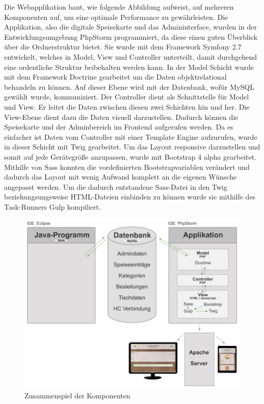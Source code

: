 Die Webapplikation baut, wie folgende Abbildung aufweist, auf mehreren Komponenten auf, um eine optimale Performance zu gewährleisten.
Die Applikation, also die digitale Speisekarte und das Admininterface, wurden in der Entwicklungsumgebung PhpStorm programmiert, da diese einen guten Überblick über die Ordnerstruktur bietet.
Sie wurde mit dem Framework Symfony 2.7 entwickelt, welches in Model, View und Controller unterteilt, damit durchgehend eine ordentliche Struktur beibehalten werden kann. In der Model Schicht wurde mit dem Framework Doctrine gearbeitet um die Daten objektrelational behandeln zu können. Auf dieser Ebene wird mit der Datenbank, wofür MySQL gewählt wurde, kommuniziert.
Der Controller dient als Schnittstelle für Model und View. Er leitet die Daten zwischen diesen zwei Schichten hin und her.
Die View-Ebene dient dazu die Daten visuell darzustellen. Dadurch können die Speisekarte und der Adminbereich im Frontend aufgerufen werden. Da es einfacher ist Daten vom Controller mit einer Template Engine aufzurufen, wurde in dieser Schicht mit Twig gearbeitet. Um das Layout responsive darzustellen und somit auf jede Gerätegröße anzupassen, wurde mit Bootstrap 4 alpha gearbeitet. Mithilfe von Sass konnten die vordefinierten Bootstrapvariablen verändert und dadurch das Layout mit wenig Aufwand komplett an die eigenen Wünsche angepasst werden.
Um die dadurch entstandene Sass-Datei in den Twig beziehungsungsweise HTML-Dateien einbinden zu können wurde sie mithilfe des Task-Runners Gulp kompiliert.\\
			\begin{figure}[H]
			\begin{centering}
			\includegraphics[width = 1\textwidth]{Bilder/Jok_zusammenspiel_applikation}
			\par\end{centering}
			\caption{Zusammenspiel der Komponenten}
			\label{Zusammenspiel der Komponenten}
			\end{figure}

